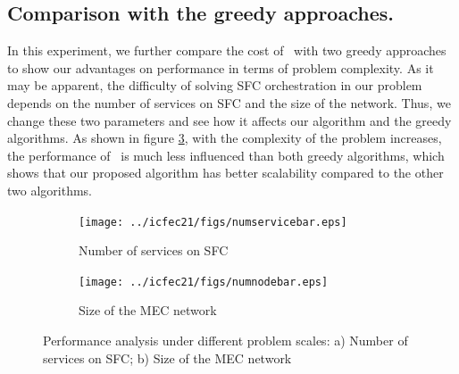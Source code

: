 \subsection{Comparison with the greedy approaches.}
In this experiment, we further compare the cost of \myalgorithm\ with two greedy approaches to show our advantages on performance in terms of problem complexity. As it may be apparent, the difficulty of solving SFC orchestration in our problem depends on the number of services on SFC and the size of the network. Thus, we change these two parameters and see how it affects our algorithm and the greedy algorithms. As shown in figure \ref{fig: scalability}, with the complexity of the problem increases,  the performance of \myalgorithm\ is much less influenced than both greedy algorithms, which shows that our proposed algorithm has better scalability compared to the other two algorithms.
\begin{figure}[t]
	\centering
	\begin{subfigure}[b]{.45\textwidth}
		\centering
		\texttt{[image: ../icfec21/figs/numservicebar.eps]}
		\caption{Number of services on SFC}
		\label{fig:numservicebar}
	\end{subfigure}
	\begin{subfigure}[b]{.45\textwidth}
		\centering
		\texttt{[image: ../icfec21/figs/numnodebar.eps]}
		\caption{Size of the MEC network}
		\label{fig:numnodebar}
	\end{subfigure}
	\vspace{\baselineskip}
	\caption{ Performance analysis under different problem scales: a) Number of services on SFC; b) Size of the MEC network}
	\label{fig: scalability}
\end{figure}










